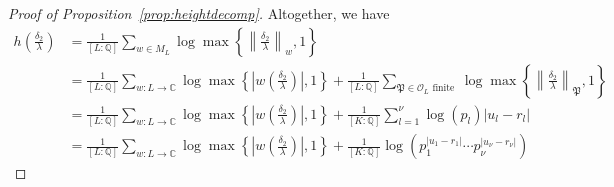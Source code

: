 \begin{proof}[Proof of Proposition~\ref{prop:heightdecomp}]
Altogether, we have
\begin{align*}
h\left(\frac{\delta_2}{\lambda}\right)
	& =\frac{1}{[L:\mathbb{Q}]}\sum_{w \in M_L} \log \max \left\{ \left\|\frac{\delta_2}{\lambda}\right\|_{w}, 1\right\}\\
	& = \frac{1}{[L:\mathbb{Q}]}\sum_{w :L \to \mathbb{C}} \log \max \left\{ \left|w\left(\frac{\delta_2}{\lambda}\right)\right|, 1\right\} + \frac{1}{[L:\mathbb{Q}]}\sum_{\mathfrak{P} \in \mathcal{O}_L \text{ finite }} \log \max \left\{ \left\|\frac{\delta_2}{\lambda}\right\|_{\mathfrak{P}}, 1\right\}\\
	& = \frac{1}{[L:\mathbb{Q}]}\sum_{w :L \to \mathbb{C}} \log \max \left\{ \left|w\left(\frac{\delta_2}{\lambda}\right)\right|, 1\right\} + \frac{1}{[K:\mathbb{Q}]}\sum_{l = 1}^{\nu} \log(p_l)|u_l - r_l|\\
	& = \frac{1}{[L:\mathbb{Q}]}\sum_{w :L \to \mathbb{C}} \log \max \left\{ \left|w\left(\frac{\delta_2}{\lambda}\right)\right|, 1\right\} + \frac{1}{[K:\mathbb{Q}]}\log\left(p_1^{|u_1 - r_1|} \cdots p_{\nu}^{|u_{\nu} - r_{\nu}|}\right)
\end{align*}


\end{proof}

